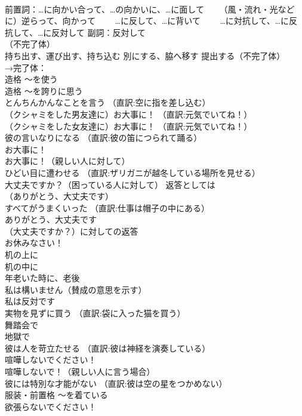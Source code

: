 \documentclass[8pt]{extreport}
\begin{document}
\begin{CJK}{UTF8}{min}
\\	前置詞：…に向かい合って、…の向かいに、…に面して 　　（風・流れ・光などに）逆らって、向かって 　　…に反して、…に背いて 　　…に対抗して、…に反抗して、…に反対して 副詞：反対して
\\	（不完了体）	
\\	持ち出す、運び出す、持ち込む 別にする、脇へ移す 提出する（不完了体） 
\\	→完了体：
\\	造格	〜を使う
\\	造格	〜を誇りに思う
\\	とんちんかんなことを言う （直訳:空に指を差し込む）
\\	（クシャミをした男友達に）お大事に！ （直訳:元気でいてね！）
\\	（クシャミをした女友達に）お大事に！ （直訳:元気でいてね！）
\\	彼の言いなりになる （直訳:彼の笛につられて踊る）
\\	お大事に！
\\	お大事に！（親しい人に対して）
\\	ひどい目に遭わせる （直訳:ザリガニが越冬している場所を見せる）
\\	大丈夫ですか？（困っている人に対して） 返答としては
\\	（ありがとう、大丈夫です）
\\	すべてがうまくいった （直訳:仕事は帽子の中にある）
\\	ありがとう、大丈夫です 
\\	（大丈夫ですか？）に対しての返答
\\	お休みなさい！
\\	机の上に
\\	机の中に
\\	年老いた時に、老後
\\	私は構いません（賛成の意思を示す）
\\	私は反対です
\\	実物を見ずに買う （直訳:袋に入った猫を買う）
\\	舞踏会で
\\	地獄で
\\	彼は人を苛立たせる （直訳:彼は神経を演奏している）
\\	喧嘩しないでください！
\\	喧嘩しないで！（親しい人に言う場合）
\\	彼には特別な才能がない （直訳:彼は空の星をつかめない）
\\	服装・前置格	〜を着ている
\\	欲張らないでください！

\end{CJK}
\end{document}
